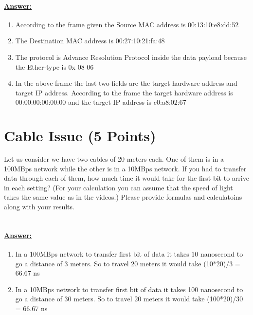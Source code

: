\documentclass{WeSTassignment}
\begin{document}
\paragraph{\underline{Answer:}}
\begin{enumerate}
\item According to the frame given the Source MAC address is 00:13:10:e8:dd:52
\item The Destination MAC address is 00:27:10:21:fa:48
\item The protocol is Advance Resolution Protocol inside the data payload because the Ether-type is 0x 08 06
\item In the above frame the last two fields are the target hardware address and target IP address. According to the frame the target hardware address is 00:00:00:00:00:00 and the target IP address is c0:a8:02:67
\end{enumerate}

\section{Cable Issue (5 Points)}

Let us consider we have two cables of 20 meters each. One of them is in a 100MBps network while the other is in a 10MBps network. If you had to transfer data through each of them, how much time it would take for the first bit to arrive in each setting? (For your calculation you can assume that the speed of light takes the same value as in the videos.) Please provide formulas and calculatoins along with your results. \\ \\

\paragraph{\underline{Answer:}}
\begin{enumerate}
\item In a 100MBps network to transfer first bit of data it takes 10 nanosecond to go a distance of 3 meters. So to travel 20 meters it would take (10*20)/3 = 66.67 ns
\item In a 10MBps network to transfer first bit of data it takes 100 nanosecond to go a distance of 30 meters. So to travel 20 meters it would take (100*20)/30 = 66.67 ns
\end{enumerate}
\end{document}
